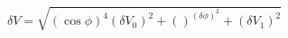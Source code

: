 \begin{equation}
\label{eq:delta_V_Malus}
\delta V = \sqrt{ \left(\cos{\phi}\right)^4(\delta V_0)^2 + \left(\right)^(\delta \phi)^2+ (\delta V_1)^2}
\end{equation}